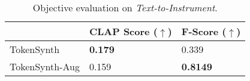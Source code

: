 \begin{table}[h]
\centering
\begin{tabular}{lll}
\hline
 & CLAP Score ($\uparrow$) & F-Score ($\uparrow$) \\ \hline
TokenSynth &  \textbf{0.179} & 0.339 \\
TokenSynth-Aug & 0.159 & \textbf{0.8149} \\ \hline
\end{tabular}
\caption{Objective evaluation on \textit{Text-to-Instrument}.}
\label{table:tti}
\end{table}
